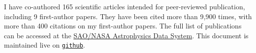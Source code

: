 I have co-authored 165 scientific articles intended for peer-reviewed 
publication, including 9 first-author papers. They have been cited more than 
9,900 times, with more than 400 citations on my 
first-author papers. The full list of publications can be accessed at the 
\href{https://goo.gl/LAu9G4}{SAO/NASA Astrophysics Data System}.
%
This document is maintained live on
\href{https://github.com/cristobal-sifon/cv/blob/master/Sifon_publications.pdf}{\texttt{github}}.


